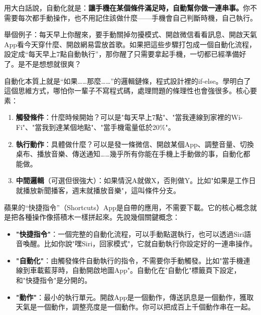 


用大白話說，自動化就是：\textbf{讓手機在某個條件滿足時，自動幫你做一連串事。}你不需要每次都手動操作，也不用記住該做什麼——手機會自己判斷時機，自己執行。

舉個例子：每天早上你醒來，要手動關掉勿擾模式、開啟微信看看訊息、開啟天氣App看今天穿什麼、開啟網易雲放首歌。如果把這些步驟打包成一個自動化流程，設定成“每天早上7點自動執行”，那你醒了只需要拿起手機，一切都已經準備好了。是不是想想就很爽？

自動化本質上就是“如果……那麼……”的邏輯鏈條，程式設計裡的if-else。學明白了這個思維方式，哪怕你一輩子不寫程式碼，處理問題的條理性也會強很多。核心要素：

\begin{enumerate}
  \item \textbf{觸發條件}：什麼時候開始？可以是"每天早上7點"、"當我連線到家裡的Wi-Fi"、"當我到達某個地點"、"當手機電量低於20\%"。
  \item \textbf{執行動作}：具體做什麼？可以是發一條微信、開啟某個App、調整音量、切換桌布、播放音樂、傳送通知……幾乎所有你能在手機上手動做的事，自動化都能做。
  \item \textbf{中間邏輯}（可選但很強大）：如果情況A就做X，否則做Y。比如"如果是工作日就播放新聞播客，週末就播放音樂"，這叫條件分支。
\end{enumerate}


蘋果的“快捷指令”（Shortcuts）App是自帶的應用，不需要下載。它的核心概念就是把各種操作像搭積木一樣拼起來。先說幾個關鍵概念：

\begin{itemize}
  \item \textbf{"快捷指令"}：一個完整的自動化流程，可以手動點選執行，也可以透過Siri語音喚醒。比如你說"嘿Siri，回家模式"，它就自動執行你設定好的一連串操作。
  \item \textbf{"自動化"}：由觸發條件自動執行的指令，不需要你手動觸發。比如"當手機連線到車載藍芽時，自動開啟地圖App"。自動化在"自動化"標籤頁下設定，和"快捷指令"是分開的。
  \item \textbf{"動作"}：最小的執行單元。開啟App是一個動作，傳送訊息是一個動作，獲取天氣是一個動作，調整亮度是一個動作。你可以把成百上千個動作串在一起。
\end{itemize}

